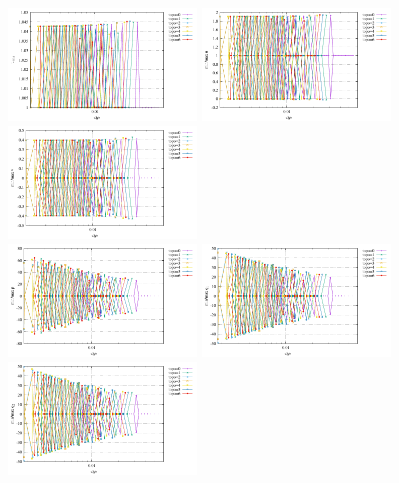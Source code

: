 \begin{center}
\includegraphics[width=5cm]{python_codes/fieldstone_78/results/vrms_exp10.pdf} 
\includegraphics[width=5cm]{python_codes/fieldstone_78/results/stats_u_exp10.pdf}
\includegraphics[width=5cm]{python_codes/fieldstone_78/results/stats_v_exp10.pdf}\\
\includegraphics[width=5cm]{python_codes/fieldstone_78/results/stats_p_exp10.pdf}
\includegraphics[width=5cm]{python_codes/fieldstone_78/results/stats_q1_exp10.pdf}
\includegraphics[width=5cm]{python_codes/fieldstone_78/results/stats_q2_exp10.pdf}
\end{center}




